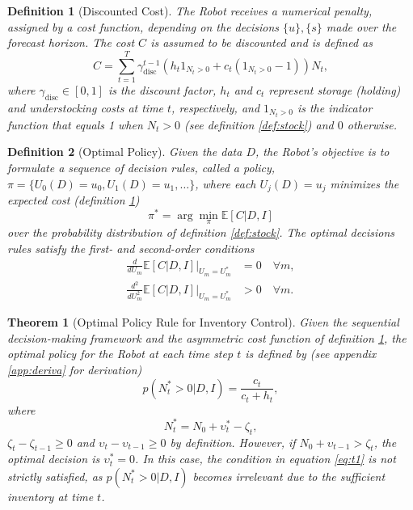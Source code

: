 \documentclass[a4paper,12pt]{article}
\newtheorem{theorem}{Theorem}
\newtheorem{definition}{Definition}
\begin{document}
	\begin{definition}[Discounted Cost]
		\label{def:cost}
		The Robot receives a numerical penalty, assigned by a cost function, depending on the decisions $\{u\}, \{s\}$ made over the forecast horizon. The cost $C$ is assumed to be discounted and is defined as
		\begin{equation}
			C = \sum_{t=1}^{T} \gamma_{\text{disc}}^{t-1} 
			\left( h_t 1_{N_t > 0} + c_t (1_{N_t > 0} - 1) \right) N_t,
			\label{eq:cost}
		\end{equation}
		where $\gamma_{\text{disc}} \in [0,1]$ is the discount factor, $h_t$ and $c_t$ represent 
		storage (holding) and understocking costs at time $t$, respectively, and 
		$1_{N_t > 0}$ is the indicator function that equals 1 when $N_t > 0$ (see definition \ref{def:stock}) and $0$ otherwise.
	\end{definition}
	
	\begin{definition}[Optimal Policy]
		\label{def:policy}
		Given the data $D$, the Robot’s objective is to formulate a sequence of decision rules, called a policy, $\pi = \{U_0(D)=u_0, U_1(D)=u_1, \dots\}$, where each $U_j(D) = u_j$ minimizes the expected cost (definition \ref{def:cost})
		\begin{equation}
			\pi^* = \arg \min_{\pi} \mathbb{E}[C| D, I]
		\end{equation}
		over the probability distribution of definition \ref{def:stock}. The optimal decisions rules satisfy the first- and second-order conditions
		\begin{equation}
			\begin{split}
				\frac{d}{dU_m} \mathbb{E}[C | D, I] \Big|_{U_m = U_m^*} &= 0 \quad \forall m,\\
				\frac{d^2}{dU_m^2} \mathbb{E}[C | D, I] \Big|_{U_m = U_m^*} & > 0 \quad \forall m.
			\end{split}
			\label{eq:min_exp_cost}
		\end{equation}
	\end{definition}

	\begin{theorem}[Optimal Policy Rule for Inventory Control]
		\label{theorem:opt_policy}
		Given the sequential decision-making framework and the asymmetric cost function of definition \ref{def:cost}, the optimal policy for the Robot at each time step $t$ is defined by (see appendix \ref{app:deriva} for derivation)
		\begin{equation}
			p(N_t^* > 0 | D, I) = \frac{c_t}{c_t + h_t},
			\label{eq:t1}
		\end{equation}
		where
		\begin{equation}
			N_t^* = N_0 +\upsilon_t^*-\zeta_t,
		\end{equation}
		$\zeta_t-\zeta_{t-1}\geq 0$ and $\upsilon_t-\upsilon_{t-1}\geq 0$ by definition. However, if $N_0 +\upsilon_{t-1}> \zeta_t$, the optimal decision is $\upsilon_t^* = 0$. In this case, the condition in equation \eqref{eq:t1} is not strictly satisfied, as $p(N_t^* > 0 | D, I)$ becomes irrelevant due to the sufficient inventory at time $t$.
	\end{theorem}
	
\end{document}
